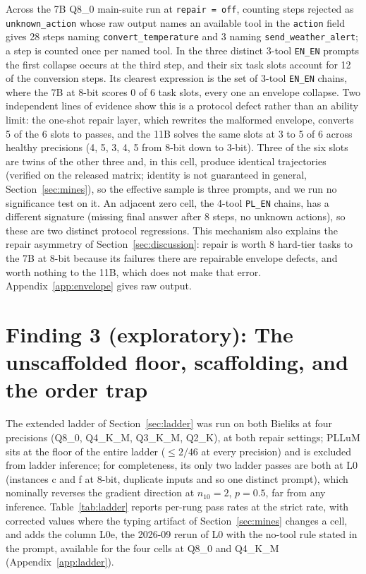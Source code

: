 \documentclass[11pt]{article}
\begin{document}
\begin{sloppypar}Across the 7B Q8\_0 main-suite run at \texttt{repair\,=\,off}, counting steps rejected as \texttt{unknown\_action} whose raw output names an available tool in the \texttt{action} field gives 28 steps naming \texttt{convert\_temperature} and 3 naming \texttt{send\_weather\_alert}; a step is counted once per named tool. In the three distinct 3-tool \texttt{EN\_EN} prompts the first collapse occurs at the third step, and their six task slots account for 12 of the conversion steps. Its clearest expression is the set of 3-tool \texttt{EN\_EN} chains, where the 7B at 8-bit scores 0 of 6 task slots, every one an envelope collapse. Two independent lines of evidence show this is a protocol defect rather than an ability limit: the one-shot repair layer, which rewrites the malformed envelope, converts 5 of the 6 slots to passes, and the 11B solves the same slots at 3 to 5 of 6 across healthy precisions (4, 5, 3, 4, 5 from 8-bit down to 3-bit). Three of the six slots are twins of the other three and, in this cell, produce identical trajectories (verified on the released matrix; identity is not guaranteed in general, Section~\ref{sec:mines}), so the effective sample is three prompts, and we run no significance test on it. An adjacent zero cell, the 4-tool \texttt{PL\_EN} chains, has a different signature (missing final answer after 8 steps, no unknown actions), so these are two distinct protocol regressions. This mechanism also explains the repair asymmetry of Section~\ref{sec:discussion}: repair is worth 8 hard-tier tasks to the 7B at 8-bit because its failures there are repairable envelope defects, and worth nothing to the 11B, which does not make that error. Appendix~\ref{app:envelope} gives raw output.\end{sloppypar}

\section{Finding 3 (exploratory): The unscaffolded floor, scaffolding, and the order trap}
\label{sec:f3}

The extended ladder of Section~\ref{sec:ladder} was run on both Bieliks at four precisions (Q8\_0, Q4\_K\_M, Q3\_K\_M, Q2\_K), at both repair settings; PLLuM sits at the floor of the entire ladder ($\le 2/46$ at every precision) and is excluded from ladder inference; for completeness, its only two ladder passes are both at L0 (instances c and f at 8-bit, duplicate inputs and so one distinct prompt), which nominally reverses the gradient direction at $n_{10}=2$, $p=0.5$, far from any inference. Table~\ref{tab:ladder} reports per-rung pass rates at the strict rate, with corrected values where the typing artifact of Section~\ref{sec:mines} changes a cell, and adds the column L0e, the 2026-09 rerun of L0 with the no-tool rule stated in the prompt, available for the four cells at Q8\_0 and Q4\_K\_M (Appendix~\ref{app:ladder}).
\end{document}
